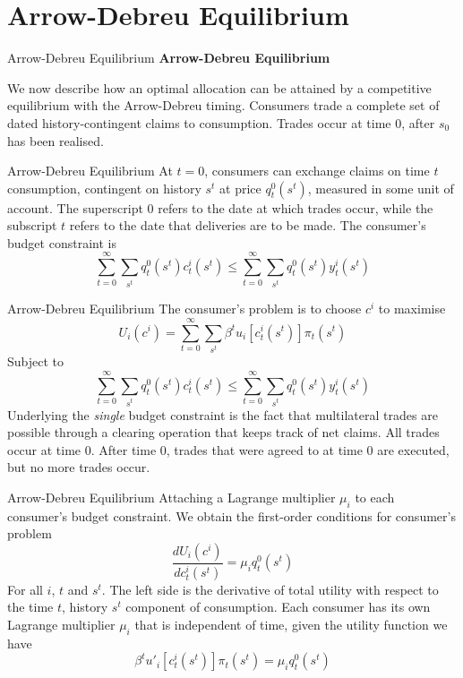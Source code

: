 \documentclass[aspectratio=169,xcolor=dvipsnames]{beamer}
\begin{document}
\section{Arrow-Debreu Equilibrium}

\begin{frame}{Arrow-Debreu Equilibrium}
    \textbf{Arrow-Debreu Equilibrium}

    We now describe how an optimal allocation can be attained by a competitive equilibrium with the Arrow-Debreu timing. Consumers trade a complete set of dated history-contingent claims to consumption. Trades occur at time 0, after $s_0$ has been realised.
\end{frame}

\begin{frame}{Arrow-Debreu Equilibrium}
    At $t = 0$, consumers can exchange claims on time $t$ consumption, contingent on history $s^t$ at price $q^0_t(s^t)$, measured in some unit of account. The superscript 0 refers to the date at which trades occur, while the subscript $t$ refers to the date that deliveries are to be made. The consumer's budget constraint is
    \[
        \sum_{t=0}^\infty \sum_{s^t} q^0_t(s^t) c^i_t(s^t) \le \sum_{t=0}^\infty \sum_{s^t} q^0_t(s^t) y^i_t(s^t)
    \]
\end{frame}

\begin{frame}{Arrow-Debreu Equilibrium}
    The consumer's problem is to choose $c^i$ to maximise
    \[
        U_i(c^i) = \sum_{t=0}^\infty \sum_{s^t} \beta^t u_i[c^i_t(s^t)] \pi_t(s^t)
    \]
    Subject to
    \[
        \sum_{t=0}^\infty \sum_{s^t} q^0_t(s^t) c^i_t(s^t) \le \sum_{t=0}^\infty \sum_{s^t} q^0_t(s^t) y^i_t(s^t)
    \]
    Underlying the \emph{single} budget constraint is the fact that multilateral trades are possible through a clearing operation that keeps track of net claims. All trades occur at time 0. After time 0, trades that were agreed to at time 0 are executed, but no more trades occur.
\end{frame}

\begin{frame}{Arrow-Debreu Equilibrium}
    Attaching a Lagrange multiplier $\mu_i$ to each consumer's budget constraint. We obtain the first-order conditions for consumer's problem
    \[
        \frac{dU_i(c^i)}{dc^i_t(s^t)} = \mu_i q^0_t(s^t)
    \]
    For all $i$, $t$ and $s^t$. The left side is the derivative of total utility with respect to the time $t$, history $s^t$ component of consumption. Each consumer has its own Lagrange multiplier $\mu_i$ that is independent of time, given the utility function we have
    \[
        \beta^t u'_i[c^i_t(s^t)] \pi_t(s^t) = \mu_i q^0_t(s^t)
    \]
\end{frame}
\end{document}

